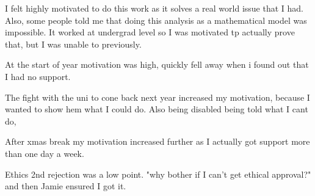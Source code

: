 I felt highly motivated to do this work as it solves a real world issue that I had. Also, some people told me that doing this analysis as a mathematical model was impossible. It worked at undergrad level so I was motivated tp actually prove that, but I was unable to previously.

At the start of year motivation was high, quickly fell away when i found out that I had no support.

The fight with the uni to cone back next year increased my motivation, because I wanted to show hem what I could do. Also being disabled being told what I cant do, 

After xmas break my motivation increased further as I actually got support more than one day a week.

Ethics 2nd rejection was a low point. "why bother if I can't get ethical approval?" and then Jamie ensured I got it.

